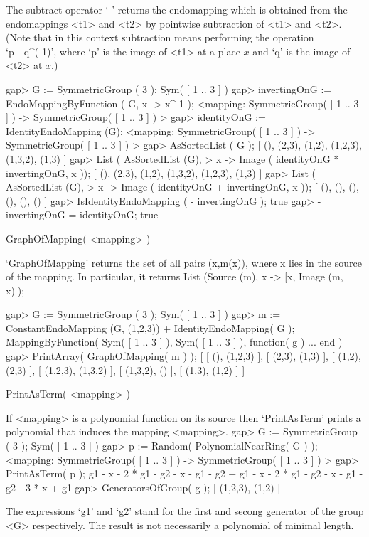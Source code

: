 The subtract operator `-' returns the endomapping which is 
obtained from the endomappings <t1> and <t2> by pointwise 
subtraction of <t1> and <t2>. (Note that in this context subtraction 
means performing the {\GAP} operation `p\ \*\ q\^{}(-1)',
where
`p' is the image of <t1> at a place $x$ and `q' is the image of <t2> at $x$.) 

\beginexample
    gap> G := SymmetricGroup ( 3 );
    Sym( [ 1 .. 3 ] )
    gap> invertingOnG := EndoMappingByFunction ( G, x -> x^-1 );
    <mapping: SymmetricGroup( [ 1 .. 3 ] ) -> SymmetricGroup(
    [ 1 .. 3 ] ) >
    gap> identityOnG := IdentityEndoMapping (G);
    <mapping: SymmetricGroup( [ 1 .. 3 ] ) -> SymmetricGroup(
    [ 1 .. 3 ] ) >
    gap> AsSortedList ( G );
    [ (), (2,3), (1,2), (1,2,3), (1,3,2), (1,3) ]
    gap> List ( AsSortedList (G), 
    >              x -> Image ( identityOnG * invertingOnG, x ));
    [ (), (2,3), (1,2), (1,3,2), (1,2,3), (1,3) ]
    gap> List ( AsSortedList (G),
    >              x -> Image ( identityOnG + invertingOnG, x ));
    [ (), (), (), (), (), () ]
    gap> IsIdentityEndoMapping ( - invertingOnG );
    true
    gap> - invertingOnG = identityOnG;
    true
\endexample



\> GraphOfMapping( <mapping> )

`GraphOfMapping' returns the set of all pairs (x,m(x)), where
x lies in the source of the mapping. In particular, it returns
List (Source (m), x -> [x, Image (m, x)]);

\beginexample
    gap> G := SymmetricGroup ( 3 );
    Sym( [ 1 .. 3 ] )
    gap> m := ConstantEndoMapping (G, (1,2,3)) + IdentityEndoMapping( G );
    MappingByFunction( Sym( [ 1 .. 3 ] ), Sym( [ 1 .. 3 ] ), function( g ) ... end )
    gap> PrintArray( GraphOfMapping( m ) );
    [ [       (),  (1,2,3) ],
      [    (2,3),    (1,3) ],
      [    (1,2),    (2,3) ],
      [  (1,2,3),  (1,3,2) ],
      [  (1,3,2),       () ],
      [    (1,3),    (1,2) ] ]
\endexample

\> PrintAsTerm( <mapping> )

If <mapping> is a polynomial function on its source then `PrintAsTerm'
prints a polynomial that induces the mapping <mapping>.
\beginexample
    gap> G := SymmetricGroup ( 3 );
    Sym( [ 1 .. 3 ] )
    gap> p := Random( PolynomialNearRing( G ) );
    <mapping: SymmetricGroup( [ 1 .. 3 ] ) -> SymmetricGroup( [ 1 .. 3 ] ) >
    gap> PrintAsTerm( p );
    g1 - x - 2 * g1 - g2 - x - g1 - g2 + g1 - x - 2 * g1 - 
    g2 - x - g1 - g2 - 3 * x + g1
    gap> GeneratorsOfGroup( g );
    [ (1,2,3), (1,2) ]
\endexample

The expressions `g1' and `g2' stand for the first and secong generator 
of the group <G> respectively. The result is not necessarily a 
polynomial of minimal length.

